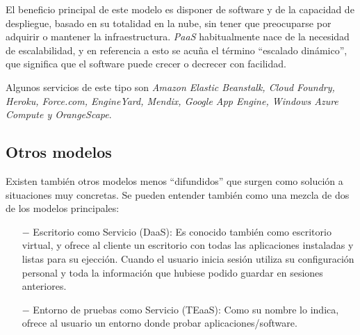 El beneficio principal de este modelo es disponer de software y de la capacidad de despliegue, basado en su totalidad en la nube, sin tener que preocuparse por adquirir o mantener la infraestructura. \textit{PaaS} habitualmente nace de la necesidad de escalabilidad, y en referencia a esto se acu\~na el t\'ermino ``escalado din\'amico'', que significa que el software puede crecer o decrecer con facilidad.

Algunos servicios de este tipo son \textit{Amazon Elastic Beanstalk, Cloud Foundry, Heroku, Force.com, EngineYard, Mendix, Google App Engine, Windows Azure Compute y OrangeScape}.

\subsection{Otros modelos}

Existen tambi\'en otros modelos menos ``difundidos'' que surgen como soluci\'on a situaciones muy concretas. Se pueden entender tambi\'en como una mezcla de dos de los modelos principales:

\begin{itemize}
\item[$-$] Escritorio como Servicio (DaaS): Es conocido tambi\'en como escritorio virtual, y ofrece al cliente un escritorio con todas las aplicaciones instaladas y listas para su ejecci\'on. Cuando el usuario inicia sesi\'on utiliza su configuraci\'on personal y toda la informaci\'on que hubiese podido guardar en sesiones anteriores.

\item[$-$] Entorno de pruebas como Servicio (TEaaS): Como su nombre lo indica, ofrece al usuario un entorno donde probar aplicaciones/software.
\end{itemize}






